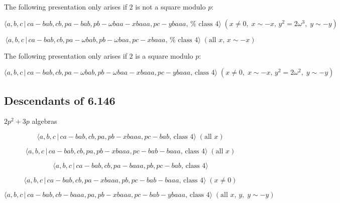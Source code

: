 \documentclass[10pt]{article}
\begin{document}
The following presentation only arises if $2$ is not a square modulo $p$:

\begin{equation}
\langle a,b,c\,|\,ca-bab,cb,pa-bab,pb-\omega baa-xbaaa,pc-ybaaa,\,\text{%
class }4\rangle \;(x\neq 0,\;x\sim -x,\,y^{2}=2\omega ^{3},\;y\sim -y) 
\tag{7.1625}
\end{equation}

\begin{equation}
\langle a,b,c\,|\,ca-bab,cb,pa-\omega bab,pb-\omega baa,pc-xbaaa,\,\text{%
class }4\rangle \;(\text{all }x,\,x\sim -x)  \tag{7.1626}
\end{equation}

The following presentation only arises if $2$ is a square modulo $p$:

\begin{equation}
\langle a,b,c\,|\,ca-bab,cb,pa-\omega bab,pb-\omega baa-xbaaa,pc-ybaaa,\,%
\text{class }4\rangle \;(x\neq 0,\;x\sim -x,\,y^{2}=2\omega ^{2},\;y\sim -y)
\tag{7.1627}
\end{equation}

\subsection{Descendants of 6.146}

$2p^{2}+3p$ algebras

\begin{equation}
\langle a,b,c\,|\,ca-bab,cb,pa,pb-xbaaa,pc-bab,\,\text{class }4\rangle \;(%
\text{all }x)  \tag{7.1628}
\end{equation}

\begin{equation}
\langle a,b,c\,|\,ca-bab,cb,pa,pb-xbaaa,pc-bab-baaa,\,\text{class }4\rangle
\;(\text{all }x)  \tag{7.1629}
\end{equation}

\begin{equation}
\langle a,b,c\,|\,ca-bab,cb,pa-baaa,pb,pc-bab,\,\text{class }4\rangle 
\tag{7.1630}
\end{equation}

\begin{equation}
\langle a,b,c\,|\,ca-bab,cb,pa-xbaaa,pb,pc-bab-baaa,\,\text{class }4\rangle
\;(x \neq 0)  \tag{7.1631}
\end{equation}

\begin{equation}
\langle a,b,c\,|\,ca-bab,cb-baaa,pa,pb-xbaaa,pc-bab-ybaaa,\,\text{class }%
4\rangle \;(\text{all }x,\,y,\;y\sim -y)  \tag{7.1632}
\end{equation}
\end{document}
